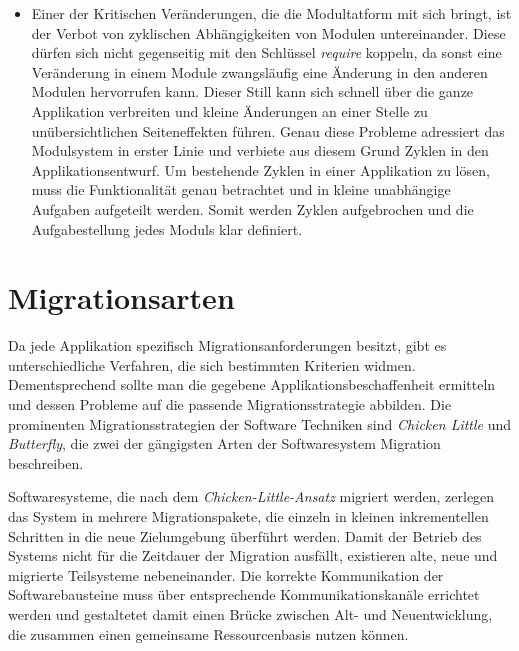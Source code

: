 \begin{itemize}
	\item Einer der Kritischen Veränderungen, die die Modultatform mit sich bringt, ist der Verbot von zyklischen Abhängigkeiten von Modulen untereinander. Diese dürfen sich nicht gegenseitig mit den Schlüssel \textit{require} koppeln, da sonst eine Veränderung in einem Module zwangsläufig eine Änderung in den anderen Modulen hervorrufen kann. Dieser Still kann sich schnell über die ganze Applikation verbreiten und kleine Änderungen an einer Stelle zu unübersichtlichen Seiteneffekten führen. Genau diese Probleme adressiert das Modulsystem in erster Linie und verbiete aus diesem Grund Zyklen in den Applikationsentwurf. Um bestehende Zyklen in einer Applikation zu lösen, muss die Funktionalität genau betrachtet und in kleine unabhängige Aufgaben aufgeteilt werden. Somit werden Zyklen aufgebrochen und die Aufgabestellung jedes Moduls klar definiert. \cite{java9modRevealed,modulProgJava9,modulMitJava9} 
\end{itemize}

\section{Migrationsarten} \label{Migratiosarten}

	Da jede Applikation spezifisch Migrationsanforderungen besitzt, gibt es unterschiedliche Verfahren, die sich bestimmten Kriterien widmen. Dementsprechend sollte man die gegebene Applikationsbeschaffenheit ermitteln und dessen Probleme auf die passende Migrationsstrategie abbilden. Die prominenten Migrationsstrategien der Software Techniken sind \textit{Chicken Little} und \textit{Butterfly}, die zwei der gängigsten Arten der Softwaresystem Migration beschreiben. \cite{sneed2016softwaremigration} \bigbreak


	Softwaresysteme, die nach dem \textit{Chicken-Little-Ansatz} migriert werden, zerlegen das System in mehrere Migrationspakete, die einzeln in kleinen inkrementellen Schritten in die neue Zielumgebung überführt werden. Damit der Betrieb des Systems nicht für die Zeitdauer der Migration ausfällt, existieren alte, neue und migrierte Teilsysteme nebeneinander. Die korrekte Kommunikation der Softwarebausteine muss über entsprechende Kommunikationskanäle errichtet werden und gestaltetet damit einen Brücke zwischen Alt- und Neuentwicklung, die zusammen einen gemeinsame Ressourcenbasis nutzen können. \cite{sneed2016softwaremigration} \bigbreak

